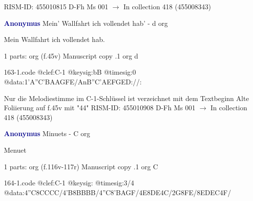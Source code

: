 \documentclass[twocolumn]{book}
\begin{document}
\newline RISM-ID: 455010815
\newline D-Fh  Ms 001
\newline $\rightarrow$ In collection 418 (455008343)
      
\newline \par \vspace{7pt} \textcolor{darkblue}{\textbf{Anonymus  }}
\newline Mein' Wallfahrt ich vollendet hab' - d
\newline org
\newline \begin{itshape}[f.45v, at left:] Mein Wallfahrt ich vollendet hab.\end{itshape} 
\newline \textcolor{darkblue}{}  1 parts: org  (f.45v)
\newline Manuscript copy
.1  org  d  
\begin{filecontents*}{163-1.code}
@clef:C-1
@keysig:bB
@timesig:0
@data:1'A''C'BAAGFE/AnB''C'AEFGED://:
\end{filecontents*}
\newline
%

\newline Nur die Melodiestimme im C-1-Schlüssel ist verzeichnet mit dem Textbeginn
\newline Alte Foliierung auf f.45v mit "44"
\newline RISM-ID: 455010908
\newline D-Fh  Ms 001
\newline $\rightarrow$ In collection 418 (455008343)
      
\newline \par \vspace{7pt} \textcolor{darkblue}{\textbf{Anonymus  }}
\newline Minuets - C
\newline org
\newline \begin{itshape}[f.116v, heading:] Menuet\end{itshape} 
\newline \textcolor{darkblue}{}  1 parts: org  (f.116v-117r)
\newline Manuscript copy
.1  org  C  
\begin{filecontents*}{164-1.code}
@clef:C-1
@keysig:
@timesig:3/4
@data:4''C{8CCCC}/4'B{8BBBB}/4''C{8'BAGF}/4E{8DE}4C/2G{8FE}/{8EDEC}4F/
\end{filecontents*}
\newline
%
\end{document}
